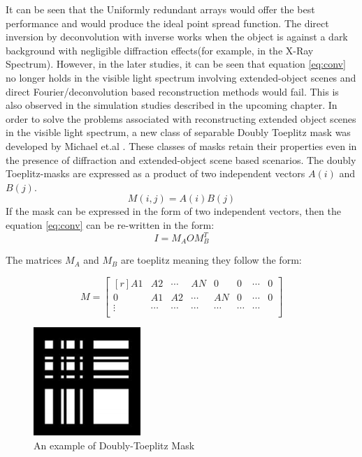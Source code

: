 It can be seen that the Uniformly redundant arrays would offer the best performance and would produce the ideal point spread function. The direct inversion by deconvolution with inverse works when the object is against a dark background with negligible diffraction effects(for example, in the X-Ray Spectrum). 
However, in the later studies\cite{Toeplitz}, it can be seen that equation \ref{eq:conv} no longer holds in the visible light spectrum involving extended-object scenes and direct Fourier/deconvolution based reconstruction methods would fail. This is also observed in the simulation studies described in the upcoming chapter. In order to solve the problems associated with reconstructing extended object scenes in the visible light spectrum, a new class of separable Doubly Toeplitz mask was developed by Michael et.al \cite{Toeplitz}. These classes of masks retain their properties even in the presence of diffraction and extended-object scene based scenarios. The doubly Toeplitz-masks are expressed as a product of two independent vectors $A(i)$ and $B(j)$.
\begin{equation}
M(i,j) = A(i)B(j)
\end{equation}
If the mask can be expressed in the form of two independent vectors, then the equation \ref{eq:conv} can be re-written in the form: 
\begin{equation}
I = M_AOM_B^T
\label{eq:separable}
\end{equation}

The matrices $M_A$ and $M_B$ are toeplitz meaning they follow the form:

\[ %
 M = 
 \begin{bmatrix*}[r]
    A1 & A2 & \cdots &AN & 0 &0 & \cdots & 0 \\
    0 & A1 & A2 & \cdots &AN & 0 & \cdots & 0\\
    \vdots &\cdots &\cdots &\cdots &\cdots&\cdots&\cdots \\
  \end{bmatrix*}
\]

\begin{figure}[ht]
\centering
\includegraphics[scale = 0.50]{pics/doubly-topelitz}
\caption{An example of Doubly-Toeplitz Mask\cite{Toeplitz}}
\label{fig:doubly_toeplitz}
\end{figure}

